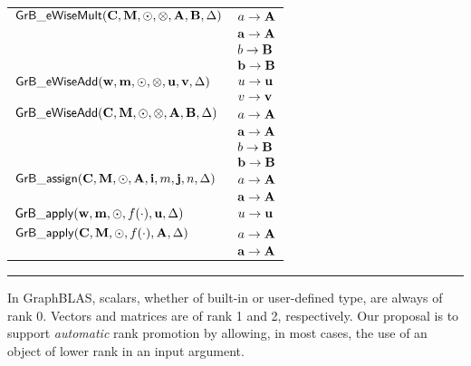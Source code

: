 \begin{table}[tb]
\begin{center}
\begin{tabular}{|l|l|}
			\hline
			${\sf GrB\_eWiseMult}({\bf C},{\bf M},\odot,\otimes,{\bf A},{\bf B},\Delta)$& $a \rightarrow {\bf A}$ \\
                                                                                                                & ${\bf a} \rightarrow {\bf A}$ \\
														& $b \rightarrow {\bf B}$ \\
                                                                                                                & ${\bf b} \rightarrow {\bf B}$ \\
			\hline
			${\sf GrB\_eWiseAdd}({\bf w},{\bf m},\odot,\otimes,{\bf u},{\bf v},\Delta)$ & $u \rightarrow {\bf u}$ \\
														& $v \rightarrow {\bf v}$ \\
			\hline
			${\sf GrB\_eWiseAdd}({\bf C},{\bf M},\odot,\otimes,{\bf A},{\bf B},\Delta)$ & $a \rightarrow {\bf A}$ \\
                                                                                                                & ${\bf a} \rightarrow {\bf A}$ \\
														& $b \rightarrow {\bf B}$ \\
                                                                                                                & ${\bf b} \rightarrow {\bf B}$ \\
			\hline
			${\sf GrB\_assign}({\bf C},{\bf M},\odot,{\bf A},{\bf i},m,{\bf j},n,\Delta)$& $a \rightarrow {\bf A}$ \\
														    & ${\bf a} \rightarrow {\bf A}$ \\
			\hline
			${\sf GrB\_apply}({\bf w},{\bf m},\odot,f(\cdot),{\bf u},\Delta)$		&  $u \rightarrow {\bf u}$ \\
			\hline
			${\sf GrB\_apply}({\bf C},{\bf M},\odot,f(\cdot),{\bf A},\Delta)$		& $a \rightarrow {\bf A}$ \\
                                                                                                                & ${\bf a} \rightarrow {\bf A}$ \\
			\hline
		\end{tabular}
	\end{center}
	\hrule
\end{table}


In GraphBLAS, scalars, whether of built-in or user-defined type, are
always of rank 0. Vectors and matrices are of rank 1 and 2, respectively.
Our proposal is to support \emph{automatic} rank promotion by allowing,
in most cases, the use of an object of lower rank in an input argument.

